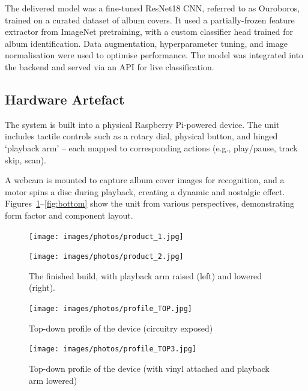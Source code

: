             The delivered model was a fine-tuned ResNet18 CNN, referred to as Ouroboros, trained on a curated dataset of album covers. It used a partially-frozen feature extractor from ImageNet pretraining, with a custom classifier head trained for album identification. Data augmentation, hyperparameter tuning, and image normalisation were used to optimise performance. The model was integrated into the backend and served via an API for live classification.
        
        \subsection{Hardware Artefact}
    
            The system is built into a physical Raspberry Pi-powered device. The unit includes tactile controls such as a rotary dial, physical button, and hinged `playback arm' -- each mapped to corresponding actions (e.g., play/pause, track skip, scan).
    
            A webcam is mounted to capture album cover images for recognition, and a motor spins a disc during playback, creating a dynamic and nostalgic effect. Figures~\ref{fig:product}–\ref{fig:bottom} show the unit from various perspectives, demonstrating form factor and component layout.
    
            \begin{figure}[H]
                \centering
                \begin{minipage}[b]{0.45\textwidth}
                    \centering
                    \texttt{[image: images/photos/product\_1.jpg]}
                \end{minipage}
                \hfill
                \begin{minipage}[b]{0.45\textwidth}
                    \centering
                    \texttt{[image: images/photos/product\_2.jpg]}
                \end{minipage}
                \caption{The finished build, with playback arm raised (left) and lowered (right).}
                \label{fig:product}
            \end{figure}
    
            \begin{figure}[H]
                \centering
                \begin{minipage}[b]{0.45\textwidth}
                    \centering
                    \texttt{[image: images/photos/profile\_TOP.jpg]}
                    \caption{Top-down profile of the device (circuitry exposed)}
                    \label{fig:top1}
                \end{minipage}
                \hfill
                \begin{minipage}[b]{0.45\textwidth}
                    \centering
                    \texttt{[image: images/photos/profile\_TOP3.jpg]}
                    \caption{Top-down profile of the device (with vinyl attached and  playback arm lowered)}
                    \label{fig:top2}
                \end{minipage}
            \end{figure}
    
